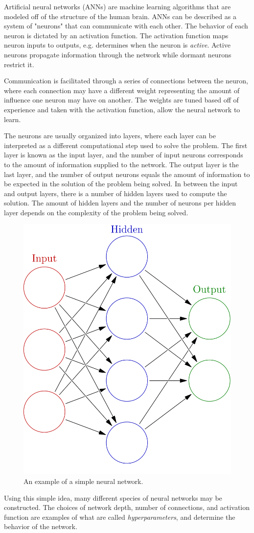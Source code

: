 \documentclass[twoside]{article}
\begin{document}
\begin{multicols}{2}
Artificial neural networks (ANNs) are machine learning algorithms that are modeled off of the structure of the human brain. ANNs can be described as a system of "neurons" that can communicate with each other. The behavior of each neuron is dictated by an activation function. The activation function maps neuron inputs to outputs, e.g. determines when the neuron is \textit{active}. Active neurons propagate information through the network while dormant neurons restrict it.  \par Communication is facilitated through a series of connections between the neuron, where each connection may have a different weight representing the amount of influence one neuron may have on another. The weights are tuned based off of experience and taken with the activation function, allow the neural network to learn. \par The neurons are usually organized into layers, where each layer can be interpreted as a different computational step used to solve the problem. The first layer is known as the input layer, and the number of input neurons corresponds to the amount of information supplied to the network. The output layer is the last layer, and the number of output neurons equals the amount of information to be expected in the solution of the problem being solved. In between the input and output layers, there is a number of hidden layers used to compute the solution. The amount of hidden layers and the number of neurons per hidden layer depends on the complexity of the problem being solved.
\begin{figure}[H]
	\centering
	\includegraphics[width=0.5\linewidth]{images/neural}
	\caption{An example of a simple neural network.}
\end{figure}
Using this simple idea, many different species of neural networks may be constructed. The choices of network depth, number of connections, and activation function are examples of what are called \textit{hyperparameters}, and determine the behavior of the network.


\end{multicols}
\end{document}
